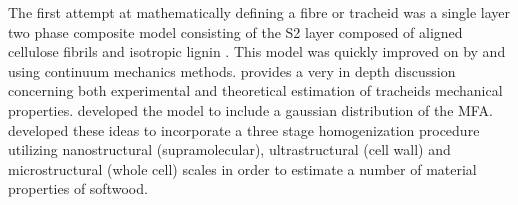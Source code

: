  The first attempt at mathematically defining a fibre or tracheid was a single layer two phase composite model consisting of the S2 layer composed of aligned cellulose fibrils and isotropic lignin \cite{Barber_1964}. This model was quickly improved on by \cite{mark1967cell} and \cite{Cave_1968} using continuum mechanics methods. \cite{mark1967cell} provides a very in depth discussion concerning both experimental and theoretical estimation of tracheids mechanical properties. \cite{Cave_1968} developed the model to include a gaussian distribution of the MFA. \cite{harrington2002hierarchical} developed these ideas to incorporate a three stage homogenization procedure utilizing nanostructural (supramolecular), ultrastructural (cell wall) and microstructural (whole cell) scales in order to estimate a number of material properties of softwood.
 
 

 

